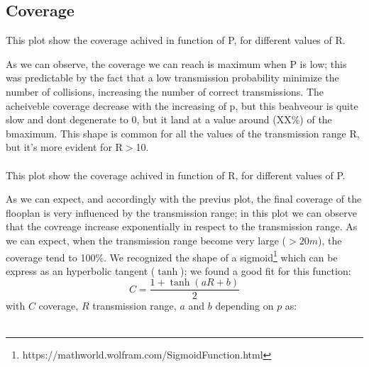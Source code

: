 \subsection{Coverage}
This plot show the coverage achived in function of P, for different values of R.
\begin{figure}[H]
    \begin{center}
    \end{center}
    \vspace*{-1cm}
\end{figure}
As we can observe, the coverage we can reach is maximum when P is low; this was predictable by the fact that a low transmission
probability minimize the number of collisions, increasing the number of correct transmissions. 
The acheiveble coverage decrease with the increasing of p, but this beahveour is quite slow and
dont degenerate to 0, but it land at a value around (XX\%) of the bmaximum. %
This shape is common for all the values of the transmission range R, but it's more evident for R$>$10.\\\\
This plot show the coverage achived in function of R, for different values of P.
\begin{figure}[H]
    \begin{center}
    \end{center}
    \vspace*{-1cm}
\end{figure}
As we can expect, and accordingly with the previus plot, the final coverage of the flooplan is very
influenced by the transmission range; in this plot we can observe that the covreage increase exponentially
in respect to the transmission range. As we can expect, when the transmission range become very large ($>20m$),
the coverage tend to 100\%. We recognized the shape of a sigmoid\footnote{https://mathworld.wolfram.com/SigmoidFunction.html} 
which can be express as an hyperbolic tangent ($ \tanh $); we found a good fit for this function:\\
\begin{equation*}
    C =  \frac{1+\tanh(aR+b)}{2} 
\end{equation*} 
with $C$ coverage, $R$ transmission range, $a$ and $b$ depending on $p$ as:\\
\\
